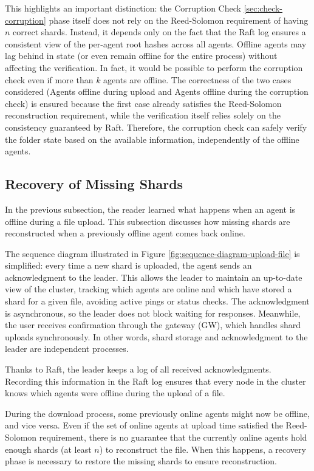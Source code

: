 This highlights an important distinction: the Corruption Check \ref{sec:check-corruption} phase itself does not rely on the Reed-Solomon requirement of having $n$ correct shards. Instead, it depends only on the fact that the Raft log ensures a consistent view of the per-agent root hashes across all agents. Offline agents may lag behind in state (or even remain offline for the entire process) without affecting the verification. In fact, it would be possible to perform the corruption check even if more than $k$ agents are offline. The correctness of the two cases considered (Agents offline during upload and Agents offline during the corruption check) is ensured because the first case already satisfies the Reed-Solomon reconstruction requirement, while the verification itself relies solely on the consistency guaranteed by Raft. Therefore, the corruption check can safely verify the folder state based on the available information, independently of the offline agents.

\subsection{Recovery of Missing Shards}

In the previous subsection, the reader learned what happens when an agent is offline during a file upload. This subsection discusses how missing shards are reconstructed when a previously offline agent comes back online.

The sequence diagram illustrated in Figure \ref{fig:sequence-diagram-upload-file} is simplified: every time a new shard is uploaded, the agent sends an acknowledgment to the leader. This allows the leader to maintain an up-to-date view of the cluster, tracking which agents are online and which have stored a shard for a given file, avoiding active pings or status checks. The acknowledgment is asynchronous, so the leader does not block waiting for responses. Meanwhile, the user receives confirmation through the gateway (GW), which handles shard uploads synchronously. In other words, shard storage and acknowledgment to the leader are independent processes.

Thanks to Raft, the leader keeps a log of all received acknowledgments. Recording this information in the Raft log ensures that every node in the cluster knows which agents were offline during the upload of a file. 

During the download process, some previously online agents might now be offline, and vice versa. Even if the set of online agents at upload time satisfied the Reed-Solomon requirement, there is no guarantee that the currently online agents hold enough shards (at least $n$) to reconstruct the file. When this happens, a recovery phase is necessary to restore the missing shards to ensure reconstruction.

